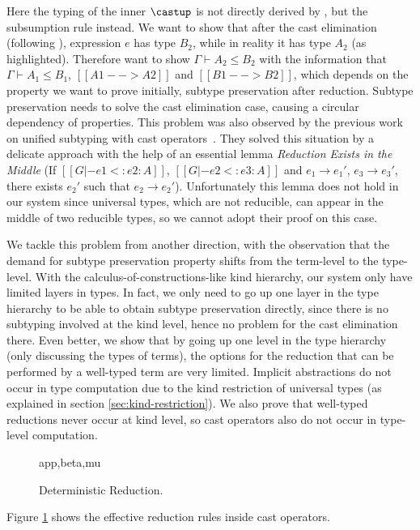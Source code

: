 Here the typing of the inner $\castup$ is not directly derived by
, but the subsumption rule instead. We want to show that after
the cast elimination (following ), expression $e$ has type $B_2$,
while in reality it has type $A_2$ (as highlighted).
Therefore want to show $\Gamma \vdash A_2 \le B_2$ with the information that
$\Gamma \vdash A_1 \le B_1$, $[[A1 --> A2]]$
and $[[B1 --> B2]]$, which depends on the property we want to prove initially,
subtype preservation after reduction.
Subtype preservation needs to solve the cast elimination case, causing a
circular dependency of properties.
This problem was also observed by the previous work on unified subtyping
with cast operators~\cite{full}. They solved this situation
by a delicate approach with the help of an essential lemma
\emph{Reduction Exists in the Middle} (If $[[G |- e1 <: e2 : A]]$, $[[G |- e2 <: e3 : A]]$
and $e_1 \longrightarrow e_1'$, $e_3 \longrightarrow e_3'$, there exists $e_2'$
such that $e_2 \longrightarrow e_2'$). Unfortunately this lemma does not hold
in our system since universal types, which are not reducible, can appear in the
middle of two reducible types, so we cannot adopt their proof on this case.

We tackle this problem from another direction, with the observation that the
demand for subtype preservation property shifts from the term-level to the type-level.
With the calculus-of-constructions-like kind hierarchy, our system only have
limited layers in types.
In fact, we only need to go up one layer in the type hierarchy to be able to
obtain subtype preservation directly,
since there is no subtyping involved at the kind level,
hence no problem for the cast elimination there.
Even better, we show that by going up one level in the type hierarchy
(only discussing the types of terms), the options
for the reduction that can be performed by a well-typed term are very limited.
Implicit abstractions do not occur in type computation due to the kind
restriction of universal types (as explained in section \ref{sec:kind-restriction}).
We also prove that well-typed reductions never occur
at kind level, so cast operators also do not occur in type-level computation.

\begin{figure}
      {app,beta,mu}
    \caption{Deterministic Reduction.}
    \label{fig:deterministic-reduction}
\end{figure}

Figure \ref{fig:deterministic-reduction} shows the effective reduction rules
inside cast operators.

